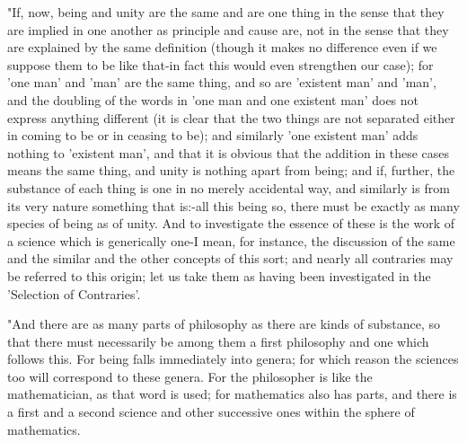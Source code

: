 "If, now, being and unity are the same and are one thing in the sense
that they are implied in one another as principle and cause are, not
in the sense that they are explained by the same definition (though
it makes no difference even if we suppose them to be like that-in
fact this would even strengthen our case); for 'one man' and 'man'
are the same thing, and so are 'existent man' and 'man', and the doubling
of the words in 'one man and one existent man' does not express anything
different (it is clear that the two things are not separated either
in coming to be or in ceasing to be); and similarly 'one existent
man' adds nothing to 'existent man', and that it is obvious that the
addition in these cases means the same thing, and unity is nothing
apart from being; and if, further, the substance of each thing is
one in no merely accidental way, and similarly is from its very nature
something that is:-all this being so, there must be exactly as many
species of being as of unity. And to investigate the essence of these
is the work of a science which is generically one-I mean, for instance,
the discussion of the same and the similar and the other concepts
of this sort; and nearly all contraries may be referred to this origin;
let us take them as having been investigated in the 'Selection of
Contraries'. 

"And there are as many parts of philosophy as there are kinds of substance,
so that there must necessarily be among them a first philosophy and
one which follows this. For being falls immediately into genera; for
which reason the sciences too will correspond to these genera. For
the philosopher is like the mathematician, as that word is used; for
mathematics also has parts, and there is a first and a second science
and other successive ones within the sphere of mathematics.

